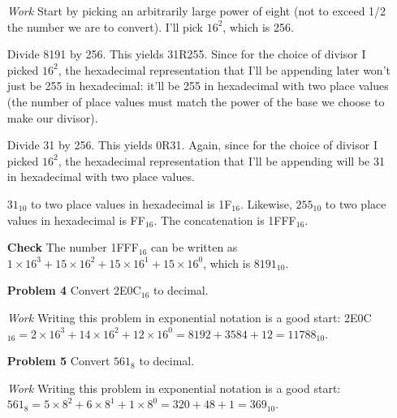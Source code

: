 \documentclass[12pt]{article}
\begin{document}
\begin{enumerate}
  \item[\textit{Work}] Start by picking an arbitrarily large power of eight (not to exceed 1/2 the number we are to convert). I'll pick $16^2$, which is 256.
  \item[] Divide 8191 by 256. This yields 31R255. Since for the choice of divisor I picked $16^2$, the hexadecimal representation that I'll be appending later won't just be 255 in hexadecimal: it'll be 255 in hexadecimal with two place values (the number of place values must match the power of the base we choose to make our divisor).
  \item[] Divide 31 by 256. This yields 0R31. Again, since for the choice of divisor I picked $16^2$, the hexadecimal representation that I'll be appending will be 31 in hexadecimal with two place values.
  \item[] $31_{10}$ to two place values in hexadecimal is 1F$_{16}$. Likewise, $255_{10}$ to two place values in hexadecimal is FF$_{16}$. The concatenation is 1FFF$_{16}$.
  \item[\textbf{Check}] The number 1FFF$_{16}$ can be written as $1\times16^3+15\times16^2+15\times16^1+15\times16^0$, which is $8191_{10}$.
\end{enumerate}

\begin{enumerate}
  \item[\textbf{Problem 4}] Convert 2E0C$_{16}$ to decimal.
\end{enumerate}

\begin{enumerate}
  \item[\textit{Work}] Writing this problem in exponential notation is a good start: 2E0C$_{16} = 2\times16^3+14\times16^2+12\times16^0 = 8192+3584+12=11788_{10}$.
\end{enumerate}

\begin{enumerate}
  \item[\textbf{Problem 5}] Convert $561_8$ to decimal.
\end{enumerate}

\begin{enumerate}
  \item[\textit{Work}] Writing this problem in exponential notation is a good start: $561_8 = 5\times8^2+6\times8^1+1\times8^0 = 320+48+1=369_{10}$.
\end{enumerate}
\end{document}
